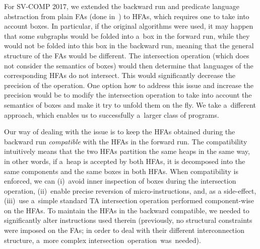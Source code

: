 
For SV-COMP 2017, we extended the backward run and predicate language abstraction from
plain FAs (done in~\cite{svcomp16}) to HFAs, which requires one to take
into account boxes.
In particular, if the original algorithms were used, it may happen that some
subgraphs would be folded into a~box in the forward run, while they would not be
folded into this box in the backward run, meaning that the general structure of the FAs would be
different.
The intersection operation (which does not
consider the semantics of boxes) would then determine that languages of the
corresponding HFAs do not intersect.
This would significantly decrease the precision of the operation.
One option how to address this issue and increase the precision would be to
modify the intersection operation to take into account the semantics of boxes
and make it try to unfold them on the fly.
We take a~different approach, which enables us to successfully a~larger class
of programs.


Our way of dealing with the issue is to keep the HFAs obtained during the
backward run \emph{compatible} with the HFAs in the
forward run.
The compatibility intuitively means that the two HFAs partition the same heaps
in the same way, in other words, if a~heap is accepted by both HFAs, it is decomposed into
the same components and the same boxes in both HFAs.
When compatibility is enforced, we can 
(i)~avoid inner inspection of boxes during the intersection operation,
(ii)~enable precise reversion of
micro-instructions, and, as a side-effect,
(iii)~use a~simple standard TA intersection operation performed component-wise on the HFAs.
To maintain the HFAs in the backward compatible, we needed to
significantly alter instructions used therein (previously, no
structural constraints were imposed on the FAs; in order to deal with their different
interconnection structure, a~more complex \mbox{intersection operation was~needed).}

